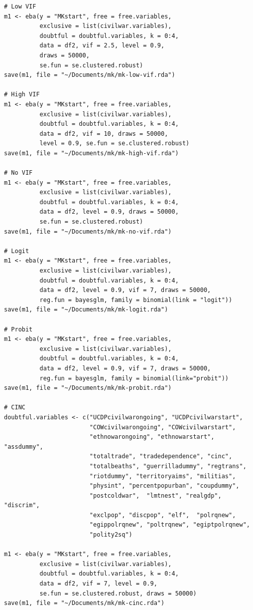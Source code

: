 \documentclass[a4paper,12pt]{article}
\begin{document}
\begin{verbatim}
# Low VIF
m1 <- eba(y = "MKstart", free = free.variables,
          exclusive = list(civilwar.variables),
          doubtful = doubtful.variables, k = 0:4,
          data = df2, vif = 2.5, level = 0.9,
          draws = 50000,
          se.fun = se.clustered.robust)
save(m1, file = "~/Documents/mk/mk-low-vif.rda")

# High VIF
m1 <- eba(y = "MKstart", free = free.variables,
          exclusive = list(civilwar.variables),
          doubtful = doubtful.variables, k = 0:4,
          data = df2, vif = 10, draws = 50000,
          level = 0.9, se.fun = se.clustered.robust)
save(m1, file = "~/Documents/mk/mk-high-vif.rda")

# No VIF
m1 <- eba(y = "MKstart", free = free.variables,
          exclusive = list(civilwar.variables),
          doubtful = doubtful.variables, k = 0:4,
          data = df2, level = 0.9, draws = 50000,
          se.fun = se.clustered.robust)
save(m1, file = "~/Documents/mk/mk-no-vif.rda")

# Logit
m1 <- eba(y = "MKstart", free = free.variables,
          exclusive = list(civilwar.variables),
          doubtful = doubtful.variables, k = 0:4,
          data = df2, level = 0.9, vif = 7, draws = 50000,
          reg.fun = bayesglm, family = binomial(link = "logit"))
save(m1, file = "~/Documents/mk/mk-logit.rda")

# Probit
m1 <- eba(y = "MKstart", free = free.variables,
          exclusive = list(civilwar.variables),
          doubtful = doubtful.variables, k = 0:4,
          data = df2, level = 0.9, vif = 7, draws = 50000,
          reg.fun = bayesglm, family = binomial(link="probit"))
save(m1, file = "~/Documents/mk/mk-probit.rda")

# CINC
doubtful.variables <- c("UCDPcivilwarongoing", "UCDPcivilwarstart",
                        "COWcivilwarongoing", "COWcivilwarstart",
                        "ethnowarongoing", "ethnowarstart", "assdummy",
                        "totaltrade", "tradedependence", "cinc",
                        "totalbeaths", "guerrilladummy", "regtrans",
                        "riotdummy", "territoryaims", "militias",
                        "physint", "percentpopurban", "coupdummy",
                        "postcoldwar",  "lmtnest", "realgdp", "discrim",
                        "exclpop", "discpop", "elf",  "polrqnew",
                        "egippolrqnew", "poltrqnew", "egiptpolrqnew",
                        "polity2sq")

m1 <- eba(y = "MKstart", free = free.variables,
          exclusive = list(civilwar.variables),
          doubtful = doubtful.variables, k = 0:4,
          data = df2, vif = 7, level = 0.9, 
          se.fun = se.clustered.robust, draws = 50000)
save(m1, file = "~/Documents/mk/mk-cinc.rda")


\end{verbatim}
\end{document}
